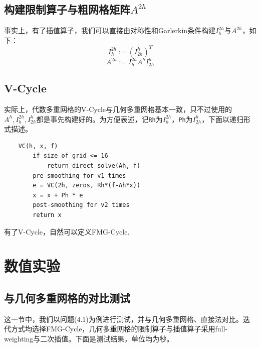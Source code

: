 \documentclass[lang=cn,10pt]{elegantbook}
\begin{document}
\subsection{构建限制算子与粗网格矩阵$A^{2h}$}

事实上，有了插值算子，我们可以直接由对称性和Garlerkin条件构建$I_{h}^{2h}$与$A^{2h}$，如下：
\begin{equation}
  I_{h}^{2h}:=(I_{2h}^{h})^T
\end{equation}
\begin{equation}
  A^{2h}:=I_{h}^{2h}A^hI_{2h}^{h}
\end{equation}

\subsection{V-Cycle}

实际上，代数多重网格的V-Cycle与几何多重网格基本一致，只不过使用的$A^h,I_h^{2h},I_{2h}^h$都是事先构建好的。为方便表述，记\verb|Rh|为$I_{h}^{2h}$，\verb|Ph|为$I_{2h}^{h}$，下面以递归形式描述。

\begin{lstlisting}
    VC(h, x, f)
        if size of grid <= 16
            return direct_solve(Ah, f)
        pre-smoothing for v1 times
        e = VC(2h, zeros, Rh*(f-Ah*x))
        x = x + Ph * e
        post-smoothing for v2 times
        return x
\end{lstlisting}

有了V-Cycle，自然可以定义FMG-Cycle.

\section{数值实验}

\subsection{与几何多重网格的对比测试}

这一节中，我们以问题(4.1)为例进行测试，并与几何多重网格、直接法对比。迭代方式均选择FMG-Cycle，几何多重网格的限制算子与插值算子采用full-weighting与二次插值。下面是测试结果，单位均为秒。
\end{document}
